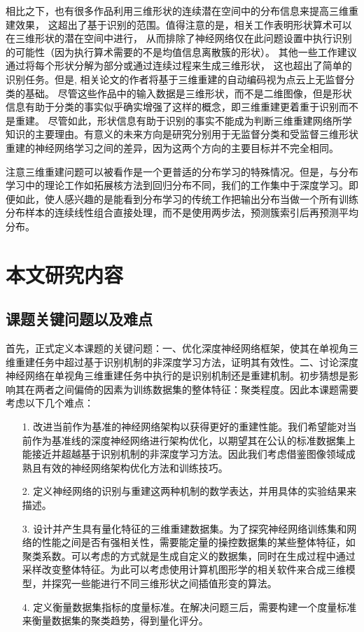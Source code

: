 \documentclass[bachelor, nocolorlinks, printoneside]{seuthesis} %
\begin{document}
\begin{Main}
相比之下，也有很多作品利用三维形状的连续潜在空间中的分布信息\cite{li2018single,gwak2017weakly,sinha2017surfnet,li2018point,wu2018learning,yang20173d,yang2019pointflow}来提高三维重建效果，
这超出了基于识别的范围。值得注意的是，相关工作\cite{wu2016learning,girdhar2016learning}表明形状算术可以在三维形状的潜在空间中进行，
从而排除了神经网络仅在此问题设置中执行识别的可能性（因为执行算术需要的不是均值信息离散簇的形状）。
其他一些工作建议通过将每个形状分解为部分\cite{tulsiani2017learning,niu2018im2struct,sung2017complementme}或通过连续过程\cite{sun2018pointgrow,choy20163d}来生成三维形状，
这也超出了简单的识别任务。但是, 相关论文\cite{wu2016learning,achlioptas2017learning,yang2018foldingnet}的作者将基于三维重建的自动编码视为点云上无监督分类的基础。
尽管这些作品中的输入数据是三维形状，而不是二维图像，但是形状信息有助于分类的事实似乎确实增强了这样的概念，即三维重建更着重于识别而不是重建。
尽管如此，形状信息有助于识别的事实不能成为判断三维重建网络所学知识的主要理由。有意义的未来方向是研究分别用于无监督分类和受监督三维形状重建的神经网络学习之间的差异，因为这两个方向的主要目标并不完全相同。

注意三维重建问题可以被看作是一个更普适的分布学习\cite{oliva2013distribution,poczos2013distribution}的特殊情况。但是，与分布学习中的理论工作如拓展核方法到回归分布不同，我们的工作集中于深度学习。即便如此，使人感兴趣的是能看到分布学习的传统工作把输出分布当做一个所有训练分布样本的连续线性组合直接处理，而不是使用两步法，预测簇索引后再预测平均分布。
\section{本文研究内容}
\subsection{课题关键问题以及难点}
首先，正式定义本课题的关键问题：一、优化深度神经网络框架，使其在单视角三维重建任务中超过基于识别机制的非深度学习方法，证明其有效性。二、讨论深度神经网络在单视角三维重建任务中执行的是识别机制还是重建机制。初步猜想是影响其在两者之间偏倚的因素为训练数据集的整体特征：聚类程度。因此本课题需要考虑以下几个难点：
\begin{enumerate}
    \item[1.]改进当前作为基准的神经网络架构以获得更好的重建性能。我们希望能对当前作为基准线的深度神经网络进行架构优化，以期望其在公认的标准数据集上能接近并超越基于识别机制的非深度学习方法。因此我们考虑借鉴图像领域成熟且有效的神经网络架构优化方法和训练技巧。
    \item[2.]定义神经网络的识别与重建这两种机制的数学表达，并用具体的实验结果来描述。
    \item[3.]设计并产生具有量化特征的三维重建数据集。为了探究神经网络训练集和网络的性能之间是否有强相关性，需要能定量的操控数据集的某些整体特征，如聚类系数。可以考虑的方式就是生成自定义的数据集，同时在生成过程中通过采样改变整体特征。为此可以考虑使用计算机图形学的相关软件来合成三维模型，并探究一些能进行不同三维形状之间插值形变的算法。
    \item[4.]定义衡量数据集指标的度量标准。在解决问题三后，需要构建一个度量标准来衡量数据集的聚类趋势，得到量化评分。   
\end{enumerate}


\end{Main}
\end{document}
